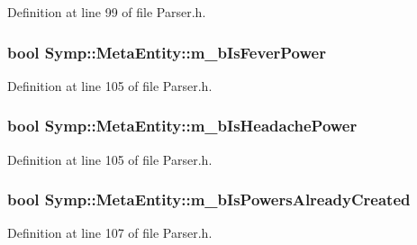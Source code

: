 Definition at line 99 of file Parser.\-h.

\hypertarget{struct_symp_1_1_meta_entity_af1fee8807b58f1653e6f3588e575b7ff}{
\subsubsection[{m\-\_\-b\-Is\-Fever\-Power}]{\setlength{\rightskip}{0pt plus 5cm}bool Symp\-::\-Meta\-Entity\-::m\-\_\-b\-Is\-Fever\-Power}}\label{struct_symp_1_1_meta_entity_af1fee8807b58f1653e6f3588e575b7ff}


Definition at line 105 of file Parser.\-h.

\hypertarget{struct_symp_1_1_meta_entity_a436aedddc0ceeb4090b702092aa372c6}{
\subsubsection[{m\-\_\-b\-Is\-Headache\-Power}]{\setlength{\rightskip}{0pt plus 5cm}bool Symp\-::\-Meta\-Entity\-::m\-\_\-b\-Is\-Headache\-Power}}\label{struct_symp_1_1_meta_entity_a436aedddc0ceeb4090b702092aa372c6}


Definition at line 105 of file Parser.\-h.

\hypertarget{struct_symp_1_1_meta_entity_a1727a3f308a073ac34e164ccd83a0838}{
\subsubsection[{m\-\_\-b\-Is\-Powers\-Already\-Created}]{\setlength{\rightskip}{0pt plus 5cm}bool Symp\-::\-Meta\-Entity\-::m\-\_\-b\-Is\-Powers\-Already\-Created}}\label{struct_symp_1_1_meta_entity_a1727a3f308a073ac34e164ccd83a0838}


Definition at line 107 of file Parser.\-h.

